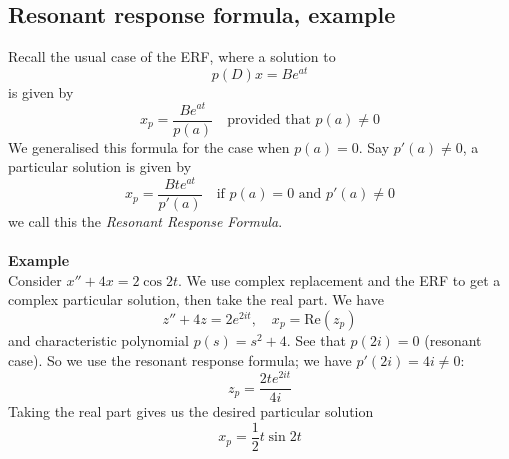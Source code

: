 \documentclass{report}
\begin{document}
\subsection{Resonant response formula, example}
Recall the usual case of the ERF, where a solution to
\begin{equation*}
p(D)x=Be^{at}
\end{equation*}
is given by 
\begin{equation*}
x_p=\frac{Be^{at}}{p(a)}\quad\text{provided that }p(a)\neq0
\end{equation*}
We generalised this formula for the case when $p(a)=0$. Say $p'(a)\neq0$, a particular solution is given by
\begin{equation*}
x_p=\frac{Bte^{at}}{p'(a)}\quad\text{if }p(a)=0\text{ and }p'(a)\neq0
\end{equation*}
we call this the \textit{Resonant Response Formula}.\\
\vspace{1mm}\\
\textbf{Example}\\
Consider $x''+4x=2\cos 2t$. We use complex replacement and the ERF to get a complex particular solution, then
take the real part. We have
\begin{equation*}
z''+4z=2e^{2it},\quad x_p=\text{Re}(z_p)
\end{equation*}
and characteristic polynomial $p(s)=s^2+4$. See that $p(2i)=0$ (resonant case). So we use
the resonant response formula; we have $p'(2i)=4i\neq0$:
\begin{equation*}
z_p=\frac{2te^{2it}}{4i}
\end{equation*}
Taking the real part gives us the desired particular solution
\begin{equation*}
x_p=\frac{1}{2}t\sin2t
\end{equation*}
\newpage
\end{document}

